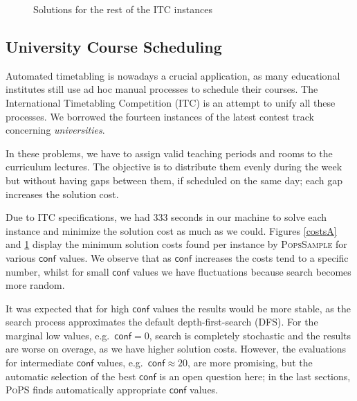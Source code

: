 \documentclass{ws-ijait}
\begin{document}
\begin{figure}
\centering

\caption{Solutions for the rest of the ITC instances\label{costsB}}
\end{figure}


\subsection{University Course Scheduling\label{ITC}}

Automated timetabling is nowadays a crucial application, as many educational institutes still use ad hoc manual processes to schedule their courses. The International Time\-ta\-bl\-in\-g Competition (ITC) is an attempt to unify all these processes. We borrowed the fourteen instances of the latest contest track concerning \emph{universities}.\cite{itc-agenda}

In these problems, we have to assign valid teaching periods and rooms to the curriculum lectures. The objective is to distribute them evenly during the week but without having gaps between them, if scheduled on the same day; each gap increases the solution cost.\cite{pothitos-ictai2012}

Due to ITC specifications, we had 333 seconds in our machine to solve each instance and minimize the solution cost as much as we could. Figures \ref{costsA} and \ref{costsB} display the minimum solution costs found per instance by \textsc{PopsSample} for various $\mathsf{conf}$ values. We observe that as $\mathsf{conf}$ increases the costs tend to a specific number, whilst for small $\mathsf{conf}$ values we have fluctuations because search becomes more random.


It was expected that for high $\mathsf{conf}$ values the results would be more stable, as the search process approximates the default depth-first-search (DFS). For the marginal low values, e.g.\ $\mathsf{conf} = 0$, search is completely stochastic and the results are worse on overage, as we have higher solution costs. However, the evaluations for intermediate $\mathsf{conf}$ values, e.g.\ $\mathsf{conf} \approx 20$, are more promising, but the automatic selection of the best $\mathsf{conf}$ is an open question here; in the last sections, \textsc{PoPS} finds automatically appropriate $\mathsf{conf}$ values.
\end{document}
